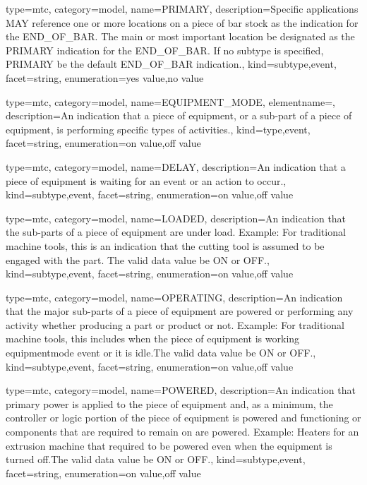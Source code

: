 {
  type=mtc,
  category=model,
  name={PRIMARY},
  description={Specific applications MAY reference one or more locations on a piece of bar stock as the indication for the END\_OF\_BAR.  The main or most important location \must be designated as the PRIMARY indication for the END\_OF\_BAR.   \newline If no \gls{subtype} is specified, PRIMARY \must be the default END\_OF\_BAR indication.},
  kind={subtype,event},
  facet={\gls{string}},
  enumeration={\gls{yes value},\gls{no value}}
}


{
  type=mtc,
  category=model,
  name={EQUIPMENT\_MODE},
  elementname=,
  description={An indication that a piece of equipment, or a sub-part of a piece of equipment, is performing specific types of activities.},
  kind={type,event},
  facet={\gls{string}},
  enumeration={\gls{on value},\gls{off value}}
}


{
  type=mtc,
  category=model,
  name={DELAY},
  description={An indication that a piece of equipment is waiting for an event or an action to occur.},
  kind={subtype,event},
  facet={\gls{string}},
  enumeration={\gls{on value},\gls{off value}}
}


{
  type=mtc,
  category=model,
  name={LOADED},
  description={An indication that the sub-parts of a piece of equipment are under load. \newline Example: For traditional machine tools, this is an indication that the cutting tool is assumed to be engaged with the part. The \gls{valid data value} \must be ON or OFF.},
  kind={subtype,event},
  facet={\gls{string}},
  enumeration={\gls{on value},\gls{off value}}
}


{
  type=mtc,
  category=model,
  name={OPERATING},
  description={An indication that the major sub-parts of a piece of equipment are powered or performing any activity whether producing a part or product or not.   \newline Example: For traditional machine tools, this includes when the piece of equipment is \gls{working equipmentmode event} or it is idle.The \gls{valid data value} \must be ON or OFF.},
  kind={subtype,event},
  facet={\gls{string}},
  enumeration={\gls{on value},\gls{off value}}
}


{
  type=mtc,
  category=model,
  name={POWERED},
  description={An indication that primary power is applied to the piece of equipment and, as a minimum, the controller or logic portion of the piece of equipment is powered and functioning or components that are required to remain on are powered. Example: Heaters for an extrusion machine that required to be powered even when the equipment is turned off.The \gls{valid data value} \must be ON or OFF.},
  kind={subtype,event},
  facet={\gls{string}},
  enumeration={\gls{on value},\gls{off value}}
}


